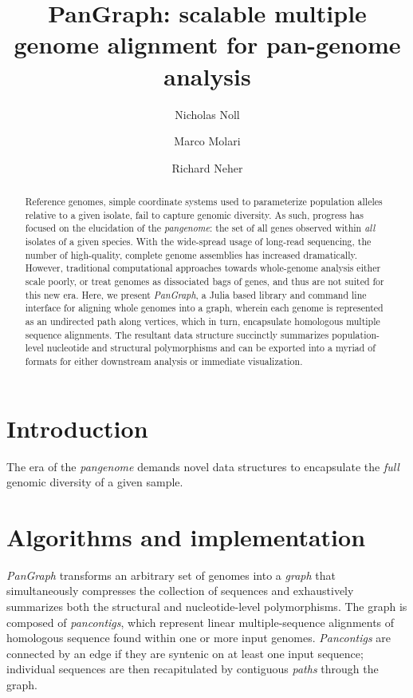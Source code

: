 \documentclass[aps,rmp,reprint,superscriptaddress,notitlepage,10pt]{revtex4-1}
\begin{document}
\title{PanGraph: scalable multiple genome alignment for pan-genome analysis}
\author{Nicholas Noll}
\author{Marco Molari}
\author{Richard Neher}

\begin{abstract}
Reference genomes, simple coordinate systems used to parameterize population alleles relative to a given isolate, fail to capture genomic diversity.
As such, progress has focused on the elucidation of the \emph{pangenome}: the set of all genes observed within \emph{all} isolates of a given species.
With the wide-spread usage of long-read sequencing, the number of high-quality, complete genome assemblies has increased dramatically.
However, traditional computational approaches towards whole-genome analysis either scale poorly, or treat genomes as dissociated bags of genes, and thus are not suited for this new era.
Here, we present \emph{PanGraph}, a Julia based library and command line interface for aligning whole genomes into a graph, wherein each genome is represented as an undirected path along vertices, which in turn, encapsulate homologous multiple sequence alignments.
The resultant data structure succinctly summarizes population-level nucleotide and structural polymorphisms and can be exported into a myriad of formats for either downstream analysis or immediate visualization.
\end{abstract}

\maketitle

\section{Introduction}
The era of the \emph{pangenome} demands novel data structures to encapsulate the \emph{full} genomic diversity of a given sample.

\section{Algorithms and implementation}
\emph{PanGraph} transforms an arbitrary set of genomes into a \emph{graph} that simultaneously compresses the collection of sequences and exhaustively summarizes both the structural and nucleotide-level polymorphisms.
The graph is composed of \emph{pancontigs}, which represent linear multiple-sequence alignments of homologous sequence found within one or more input genomes.
\emph{Pancontigs} are connected by an edge if they are syntenic on at least one input sequence; individual sequences are then recapitulated by contiguous \emph{paths} through the graph.
\end{document}
